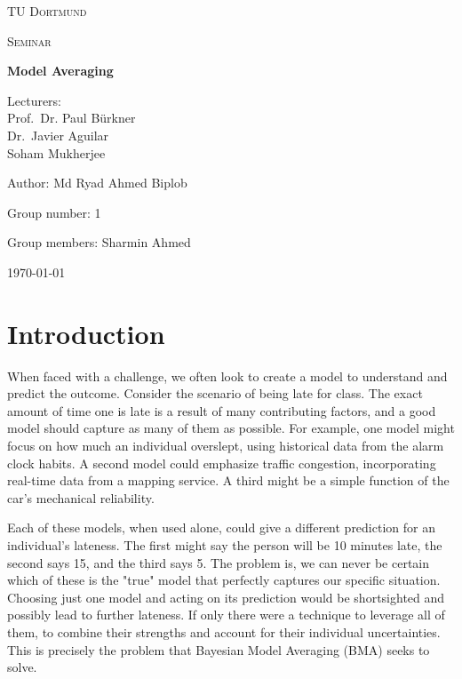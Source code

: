 \documentclass[12 pt]{scrartcl}
\begin{document}
	
	
	
	\begin{titlepage}
		\centering
		{\scshape\LARGE TU Dortmund \par}
		\vspace{1cm}
		{\scshape\Large Seminar \par}
		\vspace{2cm}
		{\huge\bfseries Model Averaging\par}
		\vspace{2cm}
		{\Large Lecturers:\\
			Prof.\ Dr. Paul Bürkner\\
			Dr.\ Javier Aguilar\\
			Soham Mukherjee\\ \par}
		\vspace{1cm}
		{\Large Author: Md Ryad Ahmed Biplob \par}
		\vspace{0.5 cm}
		{\Large Group number: 1\par}
		\vspace{0.5 cm}
		{\Large Group members: Sharmin Ahmed}
		\vfill
		{\large \today\par}
	\end{titlepage}
	
	
	
	\tableofcontents
	\thispagestyle{empty}
	
	\cleardoublepage
	
	\setcounter{page}{1}
	
	\section{Introduction}
	
	When faced with a challenge, we often look to create a model to understand and predict the outcome. Consider the scenario of being late for class. The exact amount of time one is late is a result of many contributing factors, and a good model should capture as many of them as possible. For example, one model might focus on how much an individual overslept, using historical data from the alarm clock habits. A second model could emphasize traffic congestion, incorporating real-time data from a mapping service. A third might be a simple function of the car’s mechanical reliability.
	
	Each of these models, when used alone, could give a different prediction for an individual's lateness. The first might say the person will be 10 minutes late, the second says 15, and the third says 5. The problem is, we can never be certain which of these is the "true" model that perfectly captures our specific situation. Choosing just one model and acting on its prediction would be shortsighted and possibly lead to further lateness. If only there were a technique to leverage all of them, to combine their strengths and account for their individual uncertainties. This is precisely the problem that Bayesian Model Averaging (BMA) seeks to solve.
	
\end{document}
